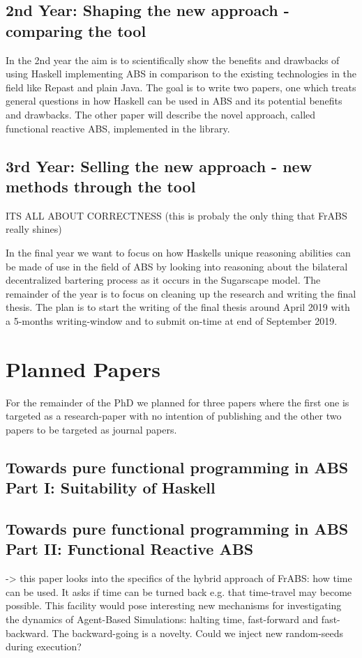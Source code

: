 \subsection{2nd Year: Shaping the new approach - comparing the tool}
In the 2nd year the aim is to scientifically show the benefits and drawbacks of using Haskell implementing ABS in comparison to the existing technologies in the field like Repast and plain Java. The goal is to write two papers, one which treats general questions in how Haskell can be used in ABS and its potential benefits and drawbacks. The other paper will describe the novel approach, called functional reactive ABS, implemented in the library. 

\subsection{3rd Year: Selling the new approach - new methods through the tool}
ITS ALL ABOUT CORRECTNESS (this is probaly the only thing that FrABS really shines)

In the final year we want to focus on how Haskells unique reasoning abilities can be made of use in the field of ABS by looking into reasoning about the bilateral decentralized bartering process as it occurs in the Sugarscape model.
The remainder of the year is to focus on cleaning up the research and writing the final thesis. The plan is to start the writing of the final thesis around April 2019 with a 5-months writing-window and to submit on-time at end of September 2019.

\section{Planned Papers}
For the remainder of the PhD we planned for three papers where the first one is targeted as a research-paper with no intention of publishing and the other two papers to be targeted as journal papers.

\subsection{Towards pure functional programming in ABS Part I: Suitability of Haskell}

\subsection{Towards pure functional programming in ABS Part II: Functional Reactive ABS}
-> this paper looks into the specifics of the hybrid approach of FrABS: how time can be used. It asks if time can be turned back e.g. that time-travel may become possible. This facility would pose interesting new mechanisms for investigating the dynamics of Agent-Based Simulations: halting time, fast-forward and fast-backward. The backward-going is a novelty. Could we inject new random-seeds during execution? 

